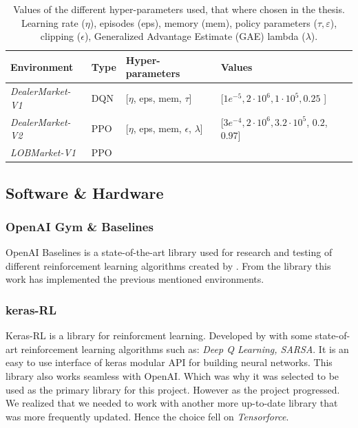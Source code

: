 \documentclass{kththesis}
\theoremstyle{definition}
\begin{document}
\begin{table}[H]
\centering
\caption{Values of the different hyper-parameters used, that where chosen in the thesis. Learning rate ($\eta$), episodes (eps), memory (mem), policy parameters ($\tau, \varepsilon$), clipping ($\epsilon$), Generalized Advantage Estimate (GAE) lambda ($\lambda$).}
\label{tab:e2}
\begin{tabular}{llll}
 \textbf{Environment} & \textbf{Type} & \textbf{Hyper-parameters} & \textbf{Values}  \\ \hline
 \textit{DealerMarket-V1} & DQN  & [$\eta$, eps, mem, $\tau$] & [$1e^{-5}, 2\cdot10^6, 1\cdot10^5, 0.25$ ]  \\
 \textit{DealerMarket-V2} & PPO  & [$\eta$, eps, mem, $\epsilon$, $\lambda$] & [$3e^{-4}, 2\cdot10^6, 3.2\cdot10^5$, $0.2$, $0.97$]  \\
 \textit{LOBMarket-V1} & PPO  & &  \\
\end{tabular}
\end{table}

\newpage
\subsection{Software \& Hardware}

\subsubsection*{OpenAI Gym \& Baselines}
OpenAI Baselines is a state-of-the-art library used for research and testing of different reinforcement learning algorithms created by \textcite{baselines}. From the library this work has implemented the previous mentioned environments.

\subsubsection*{keras-RL}
Keras-RL is a library for reinforcment learning. Developed by \textcite{plappert2016kerasrl} with some state-of-art reinforcement learning algorithms such as: \textit{Deep Q Learning, SARSA}. It is an easy to use interface of keras modular API for building neural networks. This library also works seamless with OpenAI. Which was why it was selected to be used as the primary library for this project. However as the project progressed. We realized that we needed to work with another more up-to-date library that was more frequently updated. Hence the choice fell on \textit{Tensorforce}.  
\end{document}
